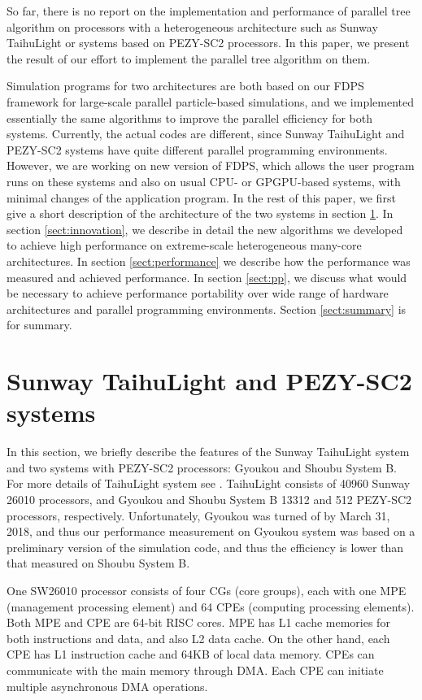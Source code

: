 \documentclass[conference]{IEEEtran}
\begin{document}
So far, there is no report on the implementation and performance of
parallel tree algorithm on processors with a heterogeneous
architecture such as Sunway TaihuLight\cite{fu2016sunway} or systems
based on PEZY-SC2 processors.  In this paper, we
present the result of our effort to implement the parallel tree
algorithm on them.

Simulation programs for two architectures are both based on our FDPS
framework for large-scale parallel particle-based simulations, and we
implemented essentially the same algorithms to improve the parallel
efficiency for both systems. Currently, the actual codes are
different, since Sunway TaihuLight and PEZY-SC2 systems have quite
different parallel programming environments. However, we are working
on new version of FDPS, which allows the user program runs on these
systems and also on usual CPU- or GPGPU-based systems, with minimal
changes of the application program. In the rest of this paper, we
first give a short description of the architecture of the two systems
in section \ref{sect:hardware}.  In section \ref{sect:innovation}, we
describe in detail the new algorithms we developed to achieve high
performance on extreme-scale heterogeneous many-core architectures.
In section \ref{sect:performance} we describe how the performance was
measured and achieved performance.  In section \ref{sect:pp}, we
discuss what would be necessary to achieve performance portability
over wide range of hardware architectures and parallel programming
environments.  Section \ref{sect:summary} is for summary.

\section{Sunway TaihuLight and PEZY-SC2 systems}
\label{sect:hardware}

In this section, we briefly describe the features of the Sunway
TaihuLight system and two systems with PEZY-SC2 processors: Gyoukou
and Shoubu System B. For more details of TaihuLight system see
\cite{Fuetal2016}.
TaihuLight consists of 40960 Sunway 26010 
processors, and Gyoukou and Shoubu System B 13312 and 512 PEZY-SC2
processors, respectively. Unfortunately, Gyoukou was turned of by
March 31, 2018, and thus our performance measurement on Gyoukou system
was based on a preliminary version of the simulation code, and thus the
efficiency is lower than that measured on Shoubu System B.

One SW26010 processor consists of four  CGs (core groups), each with one
MPE (management processing element) and 64 CPEs (computing processing
elements). Both MPE and CPE are 64-bit RISC cores. MPE has L1 cache
memories for  both instructions and data, and also L2 data cache. On
the other hand, each CPE has L1 instruction cache and 64KB of local
data memory. CPEs can communicate with the main memory through DMA.
Each CPE can initiate multiple asynchronous DMA operations. 
\end{document}

